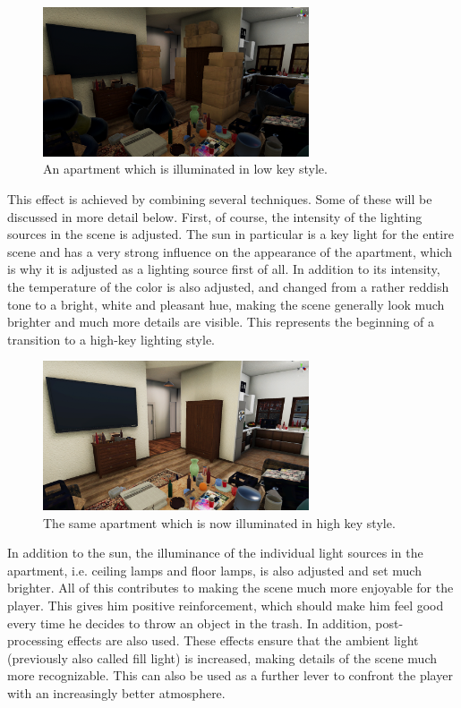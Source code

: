 \begin{figure}[H]
	\centering
		\includegraphics[width=0.7\textwidth]{Bilder/wohnzimmer Dunkel.PNG}
	\caption{An apartment which is illuminated in low key style. }
	\label{fig:darkroom}
\end{figure}
This effect is achieved by combining several techniques. Some of these will be discussed in more detail below. First, of course, the intensity of the lighting sources in the scene is adjusted. The sun in particular is a key light for the entire scene and has a very strong influence on the appearance of the apartment, which is why it is adjusted as a lighting source first of all. In addition to its intensity, the temperature of the color is also adjusted, and changed from a rather reddish tone to a bright, white and pleasant hue, making the scene generally look much brighter and much more details are visible. This represents the beginning of a transition to a high-key lighting style. 
\begin{figure}[H]
	\centering
		\includegraphics[width=0.7\textwidth]{Bilder/Wohnzimmer hell.PNG}
	\caption{The same apartment which is now illuminated in high key style. }
	\label{fig:darkroom}
\end{figure}
\newpage
In addition to the sun, the illuminance of the individual light sources in the apartment, i.e. ceiling lamps and floor lamps, is also adjusted and set much brighter. All of this contributes to making the scene much more enjoyable for the player. This gives him positive reinforcement, which should make him feel good every time he decides to throw an object in the trash. In addition, post-processing effects are also used. These effects ensure that the ambient light (previously also called fill light) is increased, making details of the scene much more recognizable. This can also be used as a further lever to confront the player with an increasingly better atmosphere.\\
